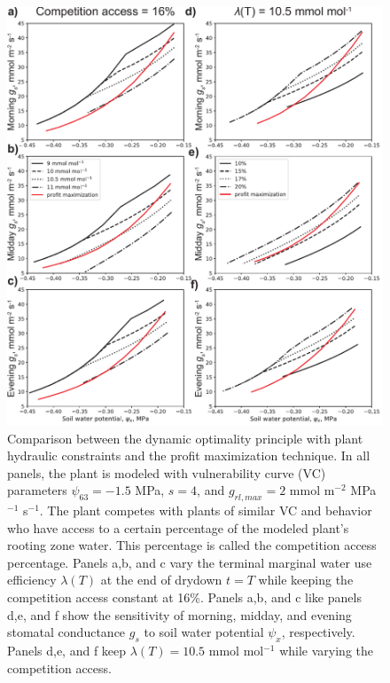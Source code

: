 \documentclass[utf8]{frontiersSCNS} %
\begin{document}
\begin{figure}[h]
    \begin{center}
         \includegraphics[scale=0.75]{profit_compare.pdf}   
    \end{center}
    \caption{Comparison between the dynamic optimality principle with plant hydraulic constraints and the profit maximization technique. In all panels, the plant is modeled with vulnerability curve (VC) parameters $\psi_{63} = -1.5$ MPa, $s=4$, and $g_{rl,max} = 2$ mmol m$^{-2}$ MPa$^{-1}$ s$^{-1}$. The plant competes with plants of similar VC and behavior who have access to a certain percentage of the modeled plant's rooting zone water. This percentage is called the competition access percentage. Panels a,b, and c vary the terminal marginal water use efficiency $\lambda(T)$ at the end of drydown $t=T$ while keeping the competition access constant at 16\%. Panels a,b, and c like panels d,e, and f show the sensitivity of morning, midday, and evening  stomatal conductance $g_s$ to soil water potential $\psi_x$, respectively. Panels d,e, and f keep $\lambda(T) = 10.5$ mmol mol$^{-1}$ while varying the competition access.} 
    \label{fig:profit_compare}
\end{figure}
\end{document}
